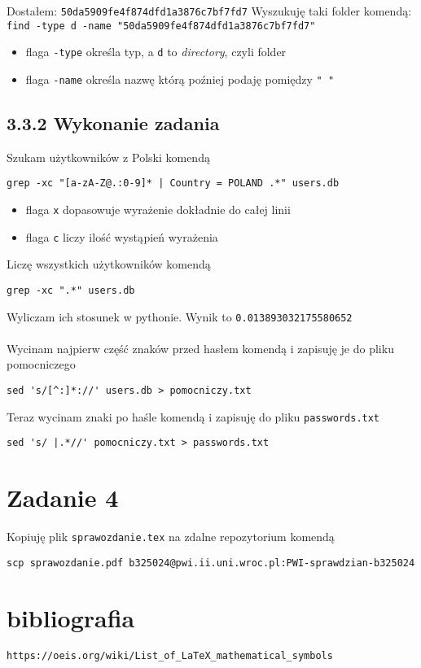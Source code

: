 \documentclass[a4paper, 11pt]{article}
\begin{document}
\noindent Dostałem: \verb+50da5909fe4f874dfd1a3876c7bf7fd7+
Wyszukuję taki folder komendą:\\
\verb+find -type d -name "50da5909fe4f874dfd1a3876c7bf7fd7"+
\begin{itemize}
    \item flaga \verb+-type+ określa typ, a \verb+d+ to \emph{directory}, czyli folder
    \item flaga \verb+-name+ określa nazwę którą poźniej podaję pomiędzy \verb+" "+
\end{itemize}

\subsection*{3.3.2 Wykonanie zadania}
Szukam użytkowników z Polski komendą
\begin{verbatim}
grep -xc "[a-zA-Z@.:0-9]* | Country = POLAND .*" users.db
\end{verbatim}
\begin{itemize}
    \item flaga \verb+x+ dopasowuje wyrażenie dokładnie do całej linii
    \item flaga \verb+c+ liczy ilość wystąpień wyrażenia
\end{itemize}
Liczę wszystkich użytkowników komendą
\begin{verbatim}
grep -xc ".*" users.db
\end{verbatim}
Wyliczam ich stosunek w pythonie. Wynik to \verb+0.013893032175580652+
\\ 
\\
Wycinam najpierw część znaków przed hasłem komendą i zapisuję je do pliku pomocniczego
\begin{verbatim}
sed 's/[^:]*://' users.db > pomocniczy.txt
\end{verbatim}
Teraz wycinam znaki po haśle komendą i zapisuję do pliku \verb+passwords.txt+
\begin{verbatim}
sed 's/ |.*//' pomocniczy.txt > passwords.txt
\end{verbatim}

\section*{Zadanie 4}
Kopiuję plik \verb+sprawozdanie.tex+ na zdalne repozytorium komendą
\begin{verbatim}
scp sprawozdanie.pdf b325024@pwi.ii.uni.wroc.pl:PWI-sprawdzian-b325024
\end{verbatim}



\section*{bibliografia}
\begin{verbatim}
https://oeis.org/wiki/List_of_LaTeX_mathematical_symbols
\end{verbatim}
\end{document}

